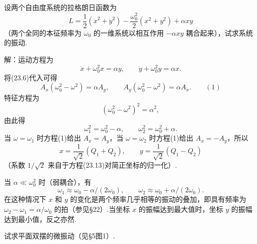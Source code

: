 \begin{xiti}

\quad 设两个自由度系统的拉格朗日函数为
\begin{equation*}
  L=\frac{1}{2}\left(\dot{x}^2+\dot{y}^2\right)
  -\frac{\omega_0^2}{2}\left(x^2+y^2\right)+\alpha xy
\end{equation*}
（两个全同的本征频率为 $\omega_0$ 的一维系统以相互作用 $-\alpha xy$ 耦合起来），试求系统的振动.

解：运动方程为
\begin{equation*}
  \ddot{x}+\omega_0^2x=\alpha y,\qquad
  \ddot{y}+\omega_0^2y=\alpha x.
\end{equation*}
将(23.6)代入可得
\begin{equation*}
  A_x\left(\omega_0^2-\omega^2\right)=\alpha A_y,\qquad
  A_y\left(\omega_0^2-\omega^2\right)=\alpha A_x.\qquad(1)
\end{equation*}
特征方程为
\begin{equation*}
  \left(\omega_0^2-\omega^2\right)^2=\alpha^2,
\end{equation*}
由此得
\begin{equation*}
  \omega_1^2=\omega_0^2-\alpha,\qquad
  \omega_2^2=\omega_0^2+\alpha.
\end{equation*}
当 $\omega=\omega_1$ 时方程(1)给出 $A_x=A_y$，当 $\omega=\omega_2$ 时方程(1)给出 $A_x=-A_y$，所以
\begin{equation*}
  x=\frac{1}{\sqrt{2}}\left(Q_1+Q_2\right),\qquad
  y=\frac{1}{\sqrt{2}}\left(Q_1-Q_2\right)
\end{equation*}
（系数 $1/\sqrt{2}$ 来自于方程(23.13)对简正坐标的归一化）.

当 $\alpha\ll\omega_0^2$ 时（弱耦合），有
\begin{equation*}
  \omega_1\approx\omega_0-\alpha/(2\omega_0),\qquad
  \omega_2\approx\omega_0+\alpha/(2\omega_0).
\end{equation*}
在这种情况下 $x$ 和 $y$ 的变化是两个频率几乎相等的振动的叠加，即具有频率为 $\omega_2-\omega_1=\alpha/\omega_0$ 的拍（参见§22）.当坐标 $x$ 的振幅达到最大值时，坐标 $y$ 的振幅达到最小值，反之亦然.

\quad 试求平面双摆的微振动（见§5图1）.


\end{xiti}
